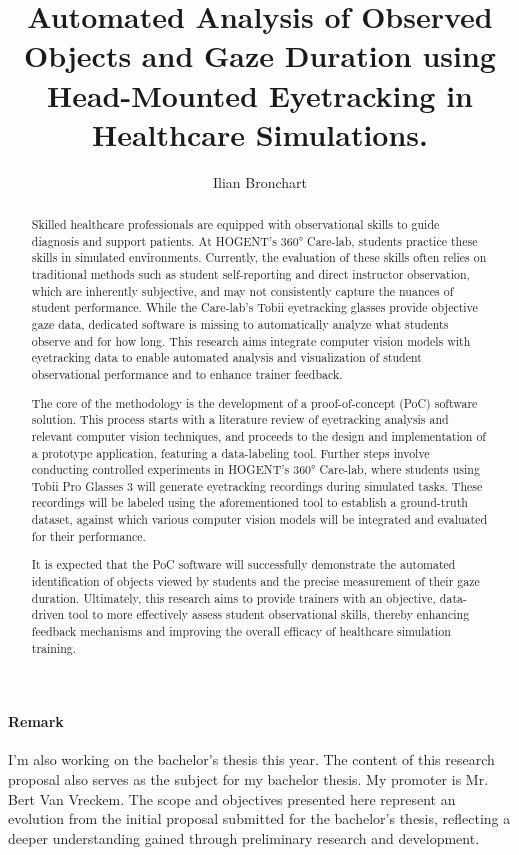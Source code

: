 \documentclass[english]{hogent-article}
\title{Automated Analysis of Observed Objects and Gaze Duration using Head-Mounted Eyetracking in Healthcare Simulations.}
\author{Ilian Bronchart}
\begin{document}
\begin{abstract}
Skilled healthcare professionals are equipped with observational skills to guide diagnosis and support patients.
At HOGENT's 360° Care-lab, students practice these skills in simulated environments.
Currently, the evaluation of these skills often relies on traditional methods such as student 
self-reporting and direct instructor observation, which are inherently subjective, and may not 
consistently capture the nuances of student performance. 
While the Care-lab's Tobii eyetracking glasses provide objective gaze data, dedicated software 
is missing to automatically analyze what students observe and for how long.
This research aims integrate computer vision models with eyetracking data 
to enable automated analysis and visualization of student observational performance and to enhance trainer feedback.

The core of the methodology is the development of a proof-of-concept (PoC) software solution. 
This process starts with a literature review of eyetracking analysis and relevant computer vision techniques, 
and proceeds to the design and implementation of a prototype application, featuring a data-labeling tool. 
Further steps involve conducting controlled experiments in HOGENT's 360° Care-lab, 
where students using Tobii Pro Glasses 3 will generate eyetracking recordings during simulated tasks. 
These recordings will be labeled using the aforementioned tool to establish a ground-truth dataset, 
against which various computer vision models will be integrated and evaluated for their 
performance.

It is expected that the PoC software will successfully demonstrate the automated identification 
of objects viewed by students and the precise measurement of their gaze duration. 
Ultimately, this research aims to provide trainers with an objective, data-driven tool to more effectively assess 
student observational skills, thereby enhancing feedback mechanisms and improving the overall efficacy of healthcare simulation training.
\end{abstract}

\tableofcontents

\bigskip

\paragraph{Remark}

I'm also working on the bachelor's thesis this year. The content of this research proposal also serves as the subject for my bachelor thesis. 
My promoter is Mr. Bert Van Vreckem. The scope and objectives presented here represent an evolution from the initial proposal submitted 
for the bachelor's thesis, reflecting a deeper understanding gained through preliminary research and development.
\end{document}
